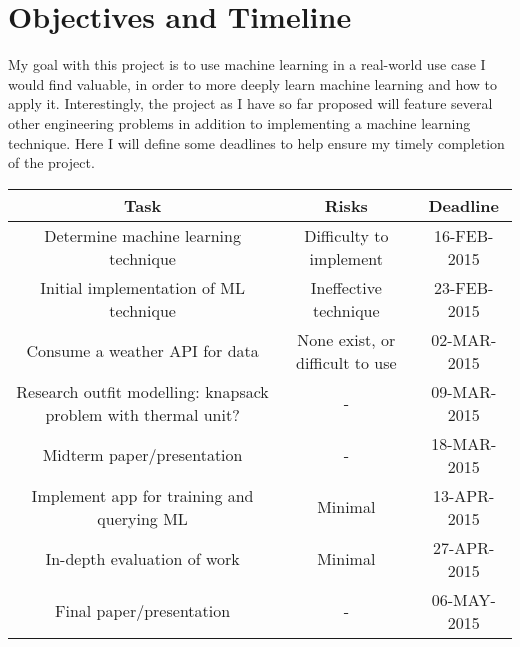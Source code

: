 \section{Objectives and Timeline}
\label{section:objectives}
My goal with this project is to use machine learning in a real-world use case I would find valuable, in order to
more deeply learn machine learning and how to apply it. Interestingly, the project as I have so far proposed will
feature several other engineering problems in addition to implementing a machine learning technique. Here I will
define some deadlines to help ensure my timely completion of the project.

\begin{center}
 \begin{tabular}{||c c c ||}
 \hline
 Task & Risks & Deadline \\ [0.5ex]
 \hline\hline
 Determine machine learning technique & Difficulty to implement & 16-FEB-2015 \\
 \hline
 Initial implementation of ML technique & Ineffective technique & 23-FEB-2015 \\
 \hline
 Consume a weather API for data & None exist, or difficult to use & 02-MAR-2015 \\
 \hline
 Research outfit modelling: knapsack problem with thermal unit? & - & 09-MAR-2015 \\
 \hline
 Midterm paper/presentation & - & 18-MAR-2015 \\
 \hline
 Implement app for training and querying ML & Minimal & 13-APR-2015 \\
 \hline
 In-depth evaluation of work & Minimal & 27-APR-2015 \\
 \hline
 Final paper/presentation & - & 06-MAY-2015 \\
 \hline
\end{tabular}
\end{center}